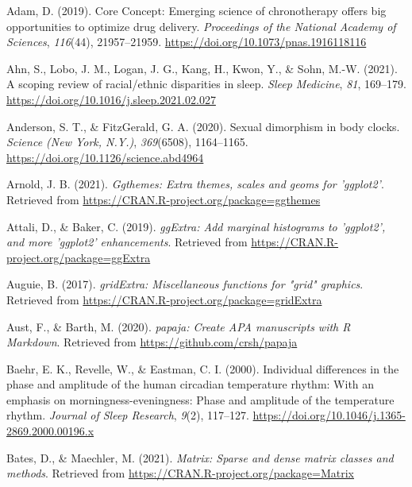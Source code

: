 \documentclass[
  english,
  jou,floatsintext]{apa6}
\newlength{\cslhangindent}
\newenvironment{CSLReferences}[2] %
 {%
  \setlength{\parindent}{0pt}
  \ifodd #1 \everypar{\setlength{\hangindent}{\cslhangindent}}\ignorespaces\fi
  \ifnum #2 > 0
  \setlength{\parskip}{#2\baselineskip}
  \fi
 }%
 {}
\begin{document}
\hypertarget{refs}{}
\begin{CSLReferences}{1}{0}
\leavevmode{}%
Adam, D. (2019). Core {Concept}: {Emerging} science of chronotherapy offers big opportunities to optimize drug delivery. \emph{Proceedings of the National Academy of Sciences}, \emph{116}(44), 21957--21959. \url{https://doi.org/10.1073/pnas.1916118116}

\leavevmode{}%
Ahn, S., Lobo, J. M., Logan, J. G., Kang, H., Kwon, Y., \& Sohn, M.-W. (2021). A scoping review of racial/ethnic disparities in sleep. \emph{Sleep Medicine}, \emph{81}, 169--179. \url{https://doi.org/10.1016/j.sleep.2021.02.027}

\leavevmode{}%
Anderson, S. T., \& FitzGerald, G. A. (2020). Sexual dimorphism in body clocks. \emph{Science (New York, N.Y.)}, \emph{369}(6508), 1164--1165. \url{https://doi.org/10.1126/science.abd4964}

\leavevmode{}%
Arnold, J. B. (2021). \emph{Ggthemes: Extra themes, scales and geoms for 'ggplot2'}. Retrieved from \url{https://CRAN.R-project.org/package=ggthemes}

\leavevmode{}%
Attali, D., \& Baker, C. (2019). \emph{ggExtra: Add marginal histograms to 'ggplot2', and more 'ggplot2' enhancements}. Retrieved from \url{https://CRAN.R-project.org/package=ggExtra}

\leavevmode{}%
Auguie, B. (2017). \emph{gridExtra: Miscellaneous functions for "grid" graphics}. Retrieved from \url{https://CRAN.R-project.org/package=gridExtra}

\leavevmode{}%
Aust, F., \& Barth, M. (2020). \emph{{papaja}: {Create} {APA} manuscripts with {R Markdown}}. Retrieved from \url{https://github.com/crsh/papaja}

\leavevmode{}%
Baehr, E. K., Revelle, W., \& Eastman, C. I. (2000). Individual differences in the phase and amplitude of the human circadian temperature rhythm: With an emphasis on morningness-eveningness: {Phase} and amplitude of the temperature rhythm. \emph{Journal of Sleep Research}, \emph{9}(2), 117--127. \url{https://doi.org/10.1046/j.1365-2869.2000.00196.x}

\leavevmode{}%
Bates, D., \& Maechler, M. (2021). \emph{Matrix: Sparse and dense matrix classes and methods}. Retrieved from \url{https://CRAN.R-project.org/package=Matrix}


\end{CSLReferences}
\end{document}
